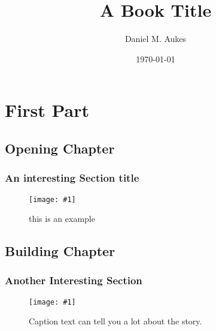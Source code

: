 \documentclass[11pt,twoside,openright]{book}%
\newcommand{\cf}[2]{
\begin{figure}[ht!]
\centering
\texttt{[image: \#1]}
\caption*{#2}
\end{figure}}
\begin{document}
\frontmatter
\title{A Book Title}
\author{Daniel M. Aukes}
\date{\today}
\maketitle
\tableofcontents

\mainmatter
\part{First Part}
\chapter{Opening Chapter}
\section*{An interesting Section title}

\cf{example.png}{this is an example}

\lipsum[1-5]

\chapter{Building Chapter}
\section*{Another Interesting Section}
\cf{example.png}{Caption text can tell you a lot about the story.}

\lipsum[6-10]

\backmatter
%
\end{document}
